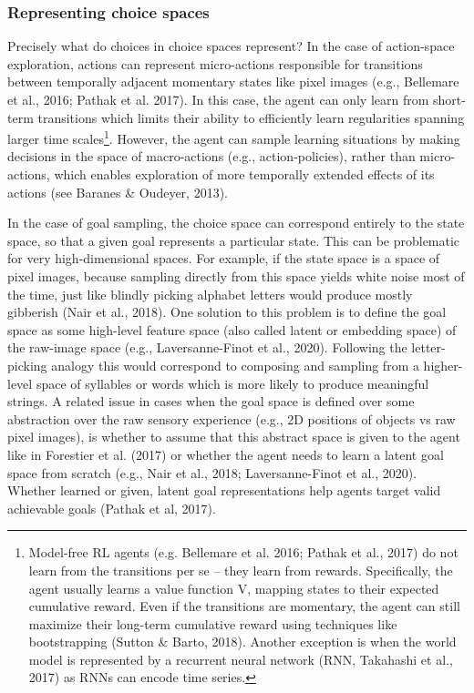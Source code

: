 \subsubsection{Representing choice spaces}
Precisely what do choices in choice spaces represent? In the case of action-space exploration, actions can represent micro-actions responsible for transitions between temporally adjacent momentary states like pixel images (e.g., Bellemare et al., 2016; Pathak et al. 2017). In this case, the agent can only learn from short-term transitions which limits their ability to efficiently learn regularities spanning larger time scales\footnote{Model-free RL agents (e.g. Bellemare et al. 2016; Pathak et al., 2017) do not learn from the transitions per se -- they learn from rewards. Specifically, the agent usually learns a value function V, mapping states to their expected cumulative reward. Even if the transitions are momentary, the agent can still maximize their long-term cumulative reward using techniques like bootstrapping (Sutton \& Barto, 2018). Another exception is when the world model is represented by a recurrent neural network (RNN, Takahashi et al., 2017) as RNNs can encode time series.}. However, the agent can sample learning situations by making decisions in the space of macro-actions (e.g., action-policies), rather than micro-actions, which enables exploration of more temporally extended effects of its actions (see Baranes \& Oudeyer, 2013). 

In the case of goal sampling, the choice space can correspond entirely to the state space, so that a given goal represents a particular state. This can be problematic for very high-dimensional spaces. For example, if the state space is a space of pixel images, because sampling directly from this space yields white noise most of the time, just like blindly picking alphabet letters would produce mostly gibberish (Nair et al., 2018). One solution to this problem is to define the goal space as some high-level feature space (also called latent or embedding space) of the raw-image space (e.g., Laversanne-Finot et al., 2020). Following the letter-picking analogy this would correspond to composing and sampling from a higher-level space of syllables or words which is more likely to produce meaningful strings. A related issue in cases when the goal space is defined over some abstraction over the raw sensory experience (e.g., 2D positions of objects vs raw pixel images), is whether to assume that this abstract space is given to the agent like in Forestier et al. (2017) or whether the agent needs to learn a latent goal space from scratch (e.g., Nair et al., 2018; Laversanne-Finot et al., 2020). Whether learned or given, latent goal representations help agents target valid achievable goals (Pathak et al, 2017).

